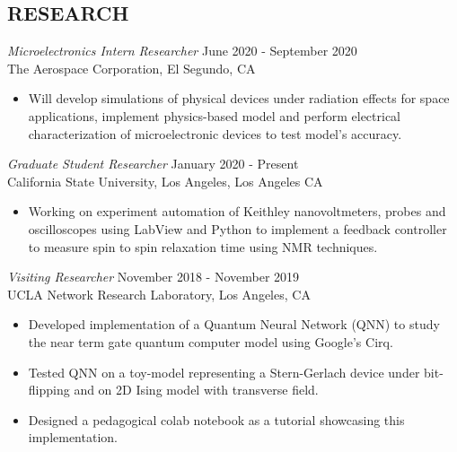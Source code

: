\documentclass[margin,line]{res}
\begin{document}
\begin{resume}
\printbibliography[title=PUBLICATIONS,heading=bibnumbered, type=inproceedings]

\section{RESEARCH} 
{\sl Microelectronics Intern Researcher} \hfill June 2020 - September 2020 \\
The Aerospace Corporation, El Segundo, CA
				\begin{itemize}
				\itemsep -2pt
\item Will develop simulations of physical devices under radiation effects for space applications, implement physics-based model and perform electrical characterization of microelectronic devices to test model's accuracy. 
					\end{itemize}
					

{\sl Graduate Student Researcher} \hfill January 2020 - Present\\
California State University, Los Angeles, Los Angeles CA
				\begin{itemize}
					\itemsep -2pt
					\item Working on experiment automation of Keithley nanovoltmeters, probes and oscilloscopes using LabView and Python to implement a feedback controller to measure spin to spin relaxation time using NMR techniques.
					\end{itemize}


{\sl Visiting Researcher} \hfill November 2018 - November 2019 \\
				UCLA Network Research Laboratory, 
                Los Angeles, CA 
				\begin{itemize}
					\itemsep -2pt
					\item Developed implementation of a Quantum Neural Network (QNN) to study the near term gate quantum computer model using Google's Cirq.  
					\item Tested QNN on a toy-model representing a Stern-Gerlach device under bit-flipping and on 2D Ising model with transverse field.
					\item Designed a pedagogical colab notebook as a tutorial showcasing this implementation.
				\end{itemize}


\end{resume}
\end{document}
